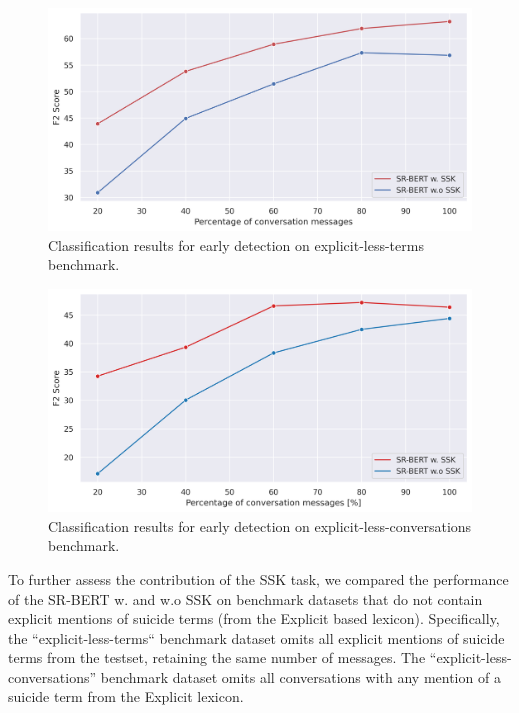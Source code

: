\documentclass[letterpaper]{article} %
\begin{document}
\begin{figure}[h]
\centering
\includegraphics[width=1.04\columnwidth]{figures/explict_F2.png}
\caption{Classification results for early detection on explicit-less-terms benchmark.}
\label{fig:explicit-less-terms}
\end{figure}

\begin{figure}[h]
\centering
\includegraphics[width=1.04\columnwidth]{figures/explicit_conv_F2.png}
\caption{Classification results for early detection on explicit-less-conversations benchmark.}
\label{fig:explicit-less-conversations}
\end{figure}


To further assess the contribution of the SSK task, we compared the performance of the SR-BERT w. and w.o SSK on benchmark datasets that do not contain explicit mentions of suicide terms (from the Explicit based lexicon). Specifically, the ``explicit-less-terms`` benchmark dataset omits all explicit mentions of suicide terms from the testset, retaining the same number of messages.
The ``explicit-less-conversations'' benchmark dataset omits all conversations with any mention of a suicide term from the Explicit lexicon.
\end{document}
